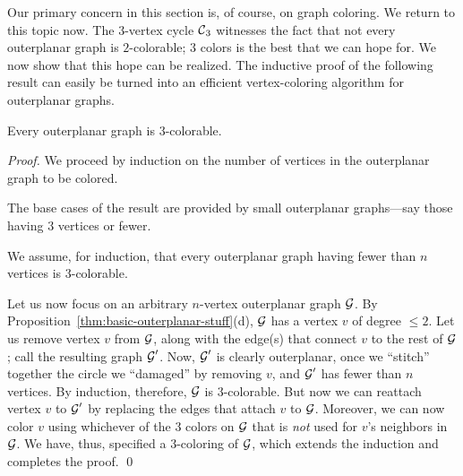 \bigskip

Our primary concern in this section is, of course, on graph coloring.
We return to this topic now.  The $3$-vertex cycle $\mbox{$\cal C$}_3$ witnesses the
fact that not every outerplanar graph is $2$-colorable; $3$ colors is
the best that we can hope for.  We now show that this hope can be
realized.  The inductive proof of the following result can easily be
turned into an efficient vertex-coloring algorithm for outerplanar
graphs.

\begin{prop}
\label{thm:OP-3-colorability}
Every outerplanar graph is $3$-colorable.
\end{prop}

\begin{proof}
We proceed by induction on the number of vertices in the outerplanar
graph to be colored.

The base cases of the result are provided by small outerplanar
graphs---say those having $3$ vertices or fewer.

We assume, for induction, that every outerplanar graph having fewer
than $n$ vertices is $3$-colorable.

Let us now focus on an arbitrary $n$-vertex outerplanar graph $\mbox{$\cal G$}$.  By
Proposition~\ref{thm:basic-outerplanar-stuff}(d), $\mbox{$\cal G$}$ has a vertex $v$
of degree $\leq 2$.  Let us remove vertex $v$ from $\mbox{$\cal G$}$, along with the
edge(s) that connect $v$ to the rest of $\mbox{$\cal G$}$; call the resulting graph
$\mbox{$\cal G$}'$.  Now, $\mbox{$\cal G$}'$ is clearly outerplanar, once we ``stitch'' together
the circle we ``damaged'' by removing $v$, and $\mbox{$\cal G$}'$ has fewer than
$n$ vertices.  By induction, therefore, $\mbox{$\cal G$}$ is $3$-colorable.  But now
we can reattach vertex $v$ to $\mbox{$\cal G$}'$ by replacing the edges that attach
$v$ to $\mbox{$\cal G$}$.  Moreover, we can now color $v$ using whichever of the
$3$ colors on $\mbox{$\cal G$}$ that is {\em not} used for $v$'s neighbors in $\mbox{$\cal G$}$.
We have, thus, specified a $3$-coloring of $\mbox{$\cal G$}$, which extends the
induction and completes the proof.  \qed
\end{proof}



